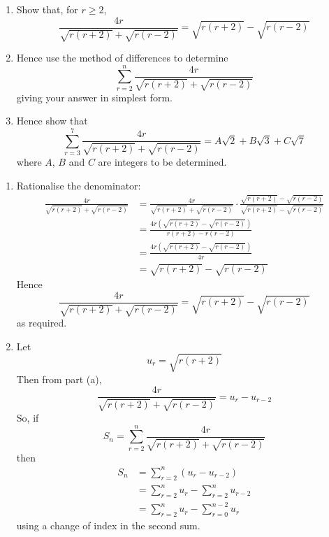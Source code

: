 \documentclass[leqno]{article}
\begin{document}
\begin{enumerate}[
  label=\textbf{\arabic*.},
  leftmargin=*,
  topsep=0pt,
  partopsep=0pt,
  parsep=0pt
]
\begin{enumerate}[label=\textbf{(\alph*)}]
  \item Show that, for $r \ge 2$,
  \[
  \frac{4r}{\sqrt{r(r+2)}+\sqrt{r(r-2)}}=\sqrt{r(r+2)}-\sqrt{r(r-2)}
  \]
  \item Hence use the method of differences to determine
  \[
  \sum_{r=2}^{n} \frac{4r}{\sqrt{r(r+2)}+\sqrt{r(r-2)}}
  \]
  giving your answer in simplest form.  \\
  \item Hence show that
  \[
  \sum_{r=3}^{7} \frac{4r}{\sqrt{r(r+2)}+\sqrt{r(r-2)}} = A\sqrt{2}+B\sqrt{3}+C\sqrt{7}
  \]
  where $A$, $B$ and $C$ are integers to be determined.  \\
\end{enumerate}

\vspace*{10pt}

\begin{tcolorbox}[colback=white, colframe=scarlet, title={\textbf{Solution}}, breakable, grow to left by=6mm, grow to right by=10mm]
\begin{enumerate}[label=\textbf{(\alph*)}]
  \item Rationalise the denominator:
  \begin{align*}
  \frac{4r}{\sqrt{r(r+2)}+\sqrt{r(r-2)}}
  &=\frac{4r}{\sqrt{r(r+2)}+\sqrt{r(r-2)}}\cdot
  \frac{\sqrt{r(r+2)}-\sqrt{r(r-2)}}{\sqrt{r(r+2)}-\sqrt{r(r-2)}}\\
  &=\frac{4r\left(\sqrt{r(r+2)}-\sqrt{r(r-2)}\right)}{r(r+2)-r(r-2)}\\
  &=\frac{4r\left(\sqrt{r(r+2)}-\sqrt{r(r-2)}\right)}{4r}\\
  &=\sqrt{r(r+2)}-\sqrt{r(r-2)}
  \end{align*}
  Hence
  \[
  \frac{4r}{\sqrt{r(r+2)}+\sqrt{r(r-2)}}=\sqrt{r(r+2)}-\sqrt{r(r-2)}
  \]
  as required.

  \item Let
  \[
  u_r=\sqrt{r(r+2)}
  \]
  Then from part (a),
  \[
  \frac{4r}{\sqrt{r(r+2)}+\sqrt{r(r-2)}}=u_r-u_{r-2}
  \]
  So, if
  \[
  S_n=\sum_{r=2}^{n}\frac{4r}{\sqrt{r(r+2)}+\sqrt{r(r-2)}}
  \]
  then
  \begin{align*}
  S_n&=\sum_{r=2}^{n}(u_r-u_{r-2})\\
  &=\sum_{r=2}^{n}u_r-\sum_{r=2}^{n}u_{r-2}\\
  &=\sum_{r=2}^{n}u_r-\sum_{r=0}^{n-2}u_r
  \end{align*}
  using a change of index in the second sum.


\end{enumerate}
\end{tcolorbox}
\end{enumerate}
\end{document}

